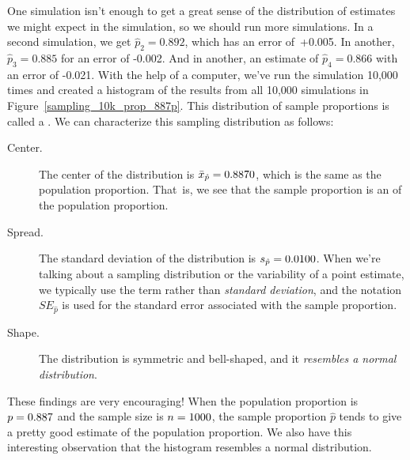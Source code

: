 One simulation isn't enough to get a great sense of the
distribution of estimates we might expect in the simulation,
so we should run more simulations.
In a second simulation,
we get $\hat{p}_2 = 0.892$, which has an error of~+0.005.
In another, $\hat{p}_3 = 0.885$ for an error of -0.002. And in another,
an estimate of $\hat{p}_4 = 0.866$ with an error of -0.021.
With the help of a computer, we've run the simulation 10,000 times
and created a histogram of the results from all 10,000 simulations
in Figure~\ref{sampling_10k_prop_887p}. This
distribution of sample proportions is called a
.
We can characterize this sampling distribution as follows:
\begin{description}
\item[Center.] The center of the distribution is
    $\bar{x}_{\hat{p}} = 0.887{}0$, which is the same as the
    population proportion.
    That~is, we see that the sample proportion is an
    of the population proportion.
\item[Spread.] The standard deviation of the distribution
    is $s_{\hat{p}} = 0.0100{}$. When we're talking about
    a sampling distribution or the variability of
    a point estimate, we typically use the term
    rather than \emph{standard deviation},
    and the notation $SE_{\hat{p}}$ is used for the standard
    error associated with the sample proportion.
\item[Shape.] The distribution is symmetric and bell-shaped,
    and it \emph{resembles a normal distribution}.
\end{description}
These findings are very encouraging! When the population
proportion is $p = 0.887{}$ and the sample size is
$n = 1000{}$,
the sample proportion $\hat{p}$ tends to give a pretty good estimate
of the population proportion. We also have this interesting observation
that the histogram resembles a normal distribution.


